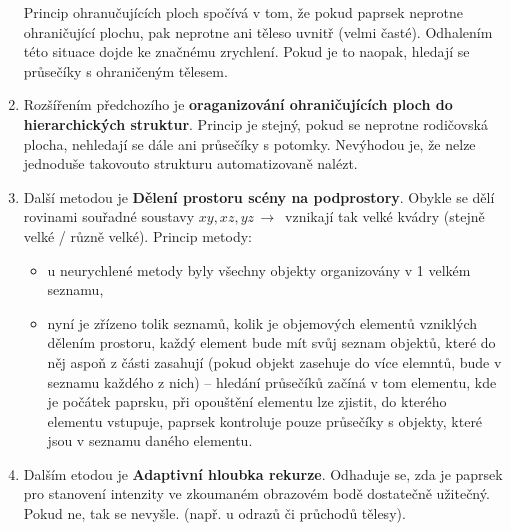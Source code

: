 \begin{enumerate}
Princip ohranučujících ploch spočívá v tom, že pokud paprsek neprotne ohraničující plochu, pak neprotne ani těleso uvnitř (velmi časté). Odhalením této situace dojde ke značnému zrychlení. Pokud je to naopak, hledají se průsečíky s ohraničeným tělesem.
\item Rozšířením předchozího je \textbf{oraganizování ohraničujících ploch do hierarchických struktur}. Princip je stejný, pokud se neprotne rodičovská plocha, nehledají se dále ani průsečíky s potomky. Nevýhodou je, že nelze jednoduše takovouto strukturu automatizovaně nalézt.
\item Další metodou je \textbf{Dělení prostoru scény na podprostory}. Obykle se dělí rovinami souřadné soustavy $xy, xz, yz \,\to\,$ vznikají tak velké kvádry (stejně velké / různě velké). Princip metody:
\begin{itemize}
	\item u neurychlené metody byly všechny objekty organizovány v 1 velkém seznamu,
	\item nyní je zřízeno tolik seznamů, kolik je objemových elementů vzniklých dělením prostoru, každý element bude mít svůj seznam objektů, které do něj aspoň z části zasahují (pokud objekt zasehuje do více elemntů, bude v seznamu každého z nich) -- hledání průsečíků začíná v tom elementu, kde je počátek paprsku, při opouštění elementu lze zjistit, do kterého elementu vstupuje, paprsek kontroluje pouze průsečíky s objekty, které jsou v seznamu daného elementu.
\end{itemize}
\item Dalším etodou je \textbf{Adaptivní hloubka rekurze}. Odhaduje se, zda je paprsek pro stanovení intenzity ve zkoumaném obrazovém bodě dostatečně užitečný. Pokud ne, tak se nevyšle. (např. u odrazů či průchodů tělesy).
\end{enumerate}
